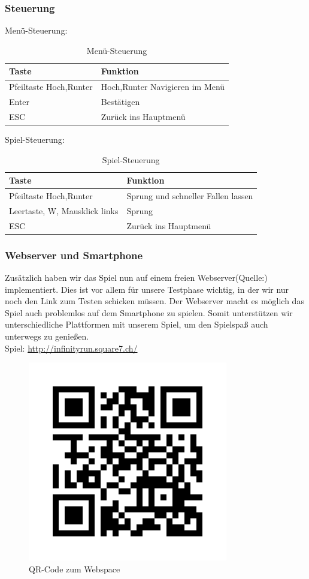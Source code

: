 \subsubsection{Steuerung}
Menü-Steuerung:
\begin{table}[H]
	\begin{tabular}{|l|l|}
		\toprule
		\textbf{Taste}& \textbf{Funktion}\\
		\midrule
		Pfeiltaste Hoch,Runter & Hoch,Runter Navigieren im Menü	\\ 
		Enter & Bestätigen\\
		ESC & Zurück ins Hauptmenü	\\ 
		\bottomrule
	\end{tabular}
	\caption{Menü-Steuerung}
\end{table}
Spiel-Steuerung:
\begin{table}[H]
	\begin{tabular}{|l|l|}
		\toprule
		\textbf{Taste}& \textbf{Funktion}\\
		\midrule
		Pfeiltaste Hoch,Runter & Sprung und schneller Fallen lassen\\ 
		Leertaste, W, Mausklick links & Sprung\\
		ESC & Zurück ins Hauptmenü\\ 
		\bottomrule
	\end{tabular}
	\caption{Spiel-Steuerung}
\end{table}
\subsubsection{Webserver und Smartphone}
Zusätzlich haben wir das Spiel nun auf einem freien Webserver(Quelle:\cite{freevar}) implementiert. Dies ist vor allem für unsere Testphase wichtig, in der wir nur noch den Link zum Testen schicken müssen. Der Webserver macht es möglich das Spiel auch problemlos auf dem Smartphone zu spielen. Somit unterstützen wir unterschiedliche Plattformen mit unserem Spiel, um den Spielspaß auch unterwegs zu genießen.\\
Spiel: \url{http://infinityrun.square7.ch/}
\begin{figure}[htb]
	\centering
	\includegraphics[scale=0.4]{content/pictures/qrcode.jpg}
	\caption{QR-Code zum Webspace}
	\label{pic:qrcode}
\end{figure}
\newpage
